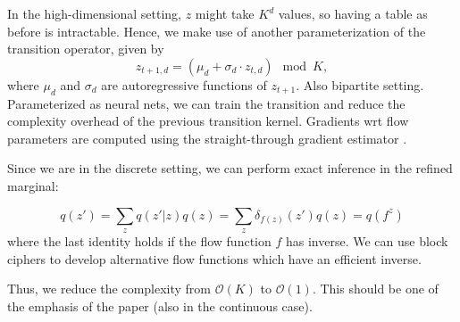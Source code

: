 In the high-dimensional setting, $z$ might take $K^d$ values, so having a table as before is intractable. Hence, we make use of another parameterization of the transition operator, given by
$$
z_{t+1,d} = (\mu_d + \sigma_d \cdot z_{t,d}) \mod K,
$$
where $\mu_d$ and $\sigma_d$ are autoregressive functions of $z_{t+1}$. Also bipartite setting. Parameterized as neural nets, we can train the transition and reduce the complexity overhead of the previous transition kernel. Gradients wrt flow parameters are computed using the straight-through gradient estimator \cite{bengio2013estimating}.

Since we are in the discrete setting, we can perform exact inference in the refined marginal:

$$
q(z') = \sum_{z} q(z'|z)q(z) = \sum_{z} \delta_{f(z)}(z') q(z) = q(f^{z})
$$
where the last identity holds if the flow function $f$ has inverse. We can use block ciphers to develop alternative flow functions which have an efficient inverse.

Thus, we reduce the complexity from $\mathcal{O}(K)$ to $\mathcal{O}(1)$. This should be one of the emphasis of the paper (also in the continuous case).




\fi


\iffalse
